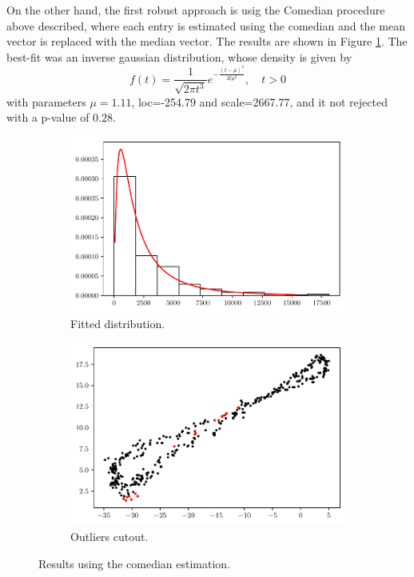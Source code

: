 \documentclass[11pt]{article}
\theoremstyle{definition}
\theoremstyle{remark}
\theoremstyle{remark}
\begin{document}
On the other hand, the first robust approach is usig the Comedian
procedure above described, where each entry is estimated using the
comedian and the mean vector is replaced with the median vector. The
results are shown in Figure \ref{fig:comedian_cut_nnoise}. The
best-fit was an inverse gaussian distribution, whose density is given
by
\[
  f(t)=\dfrac{1}{\sqrt{2\pi t^3}}e^{-\frac{(t-\mu)^2}{2t\mu^2}}, \quad
  t>0
\]
with parameters $\mu=1.11$, loc=-254.79 and scale=2667.77, and it not
rejected with a p-value of $0.28$.
\begin{figure}[H]
  \centering
  \begin{subfigure}[t]{0.475\textwidth}
    \centering
    \includegraphics[scale=0.45]{../figs/comedian_hist_no-noise.pdf}
      \caption{Fitted distribution.}
    \end{subfigure}
  \begin{subfigure}[t]{0.475\textwidth}
    \centering
    \includegraphics[scale=0.45]{../figs/comedian_scatter_no-noise.pdf}
      \caption{Outliers cutout.}
    \end{subfigure}
  \caption{Results using the comedian estimation.}
  \label{fig:comedian_cut_nnoise}
\end{figure}
\end{document}
